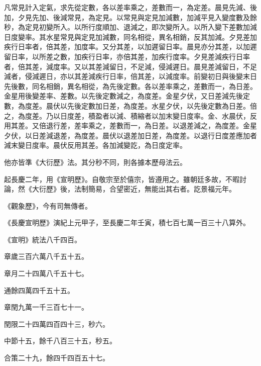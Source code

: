 \begin{pinyinscope}
 凡常見計入定氣，求先從定數，各以差率乘之，差數而一，為定差。晨見先減、後加，夕見先加、後減常見，為定見。以常見與定見加減數，加減平見入變度數及餘秒，為定見初變所入。以所行度順加、退減之，即次變所入。以所入變下差數加減日度變率。其水星常見與定見加減數，同名相從，異名相銷，反其加減。夕見差加疾行日率者，倍其差，加度率。又分其差，以加遲留日率。晨見亦分其差，以加遲留日率，以所差之數，加疾行日率，亦倍其差，加疾行度率。夕見差減疾行日率者，倍其差，減度率。又以其差減留日，不足減，侵減遲日。晨見差減留日，不足減者，侵減遲日，亦以其差減疾行日率，倍其差，以減度率。前變初日與後變末日先後數，同名相銷，異名相從，為先後定數。各以差率乘之，差數而一，為日差。金星用後變差率、差數。以先後定數減之，為度差。金星夕伏，又日差減先後定數，為度差。晨伏以先後定數加日差，為度差。水星夕伏，以先後定數為日差。倍之，為度差。乃以日度差，積盈者以減、積縮者以加末變日度率。金、水晨伏，反用其差。又倍退行差，差率乘之，差數而一，為日差。以退差減之，為度差。金星夕伏，以日差減退差，為度差。晨伏以退差加日差，為度差。以退行日度差應加者減末變日度率。晨伏反用其差。各加減變訖，為日度定率。



 他亦皆準《大衍歷》法。其分秒不同，則各據本歷母法云。



 起長慶二年，用《宣明歷》。自敬宗至於僖宗，皆遵用之。雖朝廷多故，不暇討論，然《大衍歷》後，法制簡易，合望密近，無能出其右者。訖景福元年。



 《觀象歷》，今有司無傳者。



 《長慶宣明歷》演紀上元甲子，至長慶二年壬寅，積七百七萬一百三十八算外。



 《宣明》統法八千四百。



 章歲三百六萬八千五十五。



 章月二十四萬八千五十七。



 通餘四萬四千五十五。



 章閏九萬一千三百七十一。



 閏限二十四萬四百四十三，秒六。



 中節十五，餘千八百三十五，秒五。



 合策二十九，餘四千四百五十七。




\end{pinyinscope}
